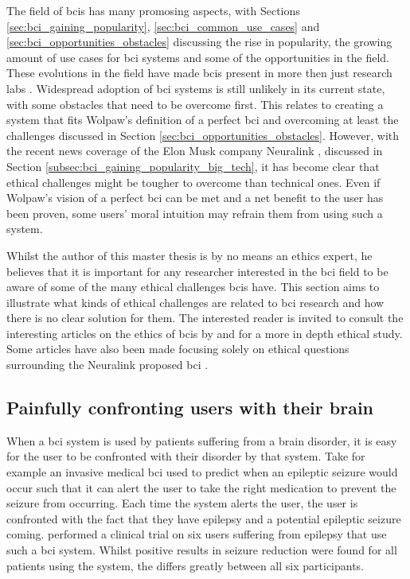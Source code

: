 The field of \glspl{bci} has many promosing aspects, with Sections \ref{sec:bci_gaining_popularity}, \ref{sec:bci_common_use_cases} and \ref{sec:bci_opportunities_obstacles} discussing the rise in popularity, the growing amount of use cases for \gls{bci} systems and some of the opportunities in the field.
These evolutions in the field have made \glspl{bci} present in more then just research labs \citep{ethical_dillemas,bci_applications}.
Widespread adoption of \gls{bci} systems is still unlikely in its current state, with some obstacles that need to be overcome first.
This relates to creating a system that fits Wolpaw's definition of a perfect \gls{bci} and overcoming at least the challenges discussed in Section \ref{sec:bci_opportunities_obstacles}.
However, with the recent news coverage of the Elon Musk company Neuralink \citep{neuralink_whitepaper}, discussed in Section \ref{subsec:bci_gaining_popularity_big_tech}, it has become clear that ethical challenges might be tougher to overcome than technical ones.
Even if Wolpaw's vision of a perfect \gls{bci} can be met and a net benefit to the user has been proven, some users' moral intuition may refrain them from using such a system.

Whilst the author of this master thesis is by no means an ethics expert, he believes that it is important for any researcher interested in the \gls{bci} field to be aware of some of the many ethical challenges \glspl{bci} have.
This section aims to illustrate what kinds of ethical challenges are related to \gls{bci} research and how there is no clear solution for them.
The interested reader is invited to consult the interesting articles on the ethics of \glspl{bci} by \citet{ethics_of_bci} and \citet{ethical_dillemas} for a more in depth ethical study.
Some articles have also been made focusing solely on ethical questions surrounding the Neuralink proposed \gls{bci} \citep{neuralink_ethics,neuralink_ethics2}.


\subsection{Painfully confronting users with their brain}
\label{subsec:bci_ethical_confronting}

When a \gls{bci} system is used by patients suffering from a brain disorder, it is easy for the user to be confronted with their disorder by that system.
Take for example an invasive medical \gls{bci} used to predict when an epileptic seizure would occur such that it can alert the user to take the right medication to prevent the seizure from occurring.
Each time the system alerts the user, the user is confronted with the fact that they have epilepsy and a potential epileptic seizure coming.
 performed a clinical trial on six users suffering from epilepsy that use such a \gls{bci} system.
Whilst positive results in seizure reduction were found for all patients using the system, the  differs greatly between all six participants.

